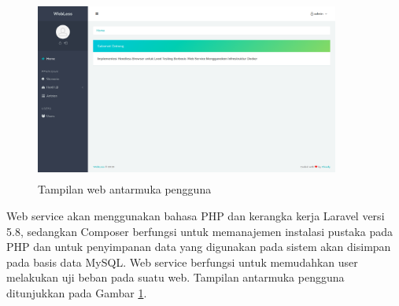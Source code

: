 			\begin{figure}[H]
				\centering
				\includegraphics[width=10cm,height=6cm]{Images/C-4/gambarweb.png}
				\caption{Tampilan web antarmuka pengguna}
				\label{gambarweb}
			\end{figure}
			
			\indent Web service akan menggunakan bahasa PHP dan kerangka kerja Laravel versi 5.8, sedangkan Composer berfungsi untuk memanajemen instalasi pustaka pada PHP dan untuk penyimpanan data yang digunakan pada sistem akan disimpan pada basis data MySQL. Web service berfungsi untuk memudahkan user melakukan uji beban pada suatu web. Tampilan antarmuka pengguna ditunjukkan pada Gambar \ref{gambarweb}. \\
			
